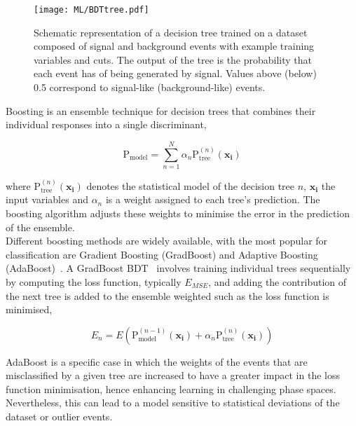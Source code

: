 \begin{figure}[htbp]
    \RawFloats
    \begin{center}
    \texttt{[image: ML/BDTtree.pdf]}
    \caption{
        Schematic representation of a decision tree trained on a dataset composed of signal and background events with example training variables and cuts. The output of the tree is the probability that each event has of being generated by signal. Values above (below) 0.5 correspond to signal-like (background-like) events.
    }
    \label{ML:BDT}
    \end{center}
\end{figure}

Boosting is an ensemble technique for decision trees that combines their individual responses into a single discriminant,

\begin{equation}
    \text{P}_{\text{model}} = \sum_{n=1}^N \alpha_n \text{P}_{\text{tree}}^{(n)}(\mathbf{x_i})
\end{equation}

where $\text{P}_{\text{tree}}^{(n)}(\mathbf{x_i})$ denotes the statistical model of the decision tree $n$, $\mathbf{x_i}$ the input variables and $\alpha_n$ is a weight assigned to each tree's prediction. The boosting algorithm adjusts these weights to minimise the error in the prediction of the ensemble.\\

Different boosting methods are widely available, with the most popular for classification are Gradient Boosting (GradBoost) and Adaptive Boosting (AdaBoost)~\cite{FREUND1997119}. A GradBoost BDT~\cite{Chen_2016} involves training individual trees sequentially by computing the loss function, typically $E_{MSE}$, and adding the contribution of the next tree is added to the ensemble weighted such as the loss function is minimised,

\begin{equation}
    E_n = E\left(\text{P}_{\text{model}}^{(n-1)}(\mathbf{x_i})+\alpha_n \text{P}_{\text{tree}}^{(n)}(\mathbf{x_i})\right)
\end{equation}

AdaBoost is a specific case in which the weights of the events that are misclassified by a given tree are increased to have a greater impact in the loss function minimisation, hence enhancing learning in challenging phase spaces. Nevertheless, this can lead to a model sensitive to statistical deviations of the dataset or outlier events.\\

